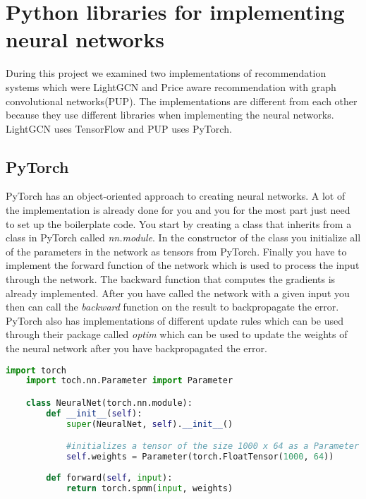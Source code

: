 \section{Python libraries for implementing neural networks}
During this project we examined two implementations of recommendation systems which were LightGCN and Price aware recommendation with graph convolutional networks(PUP). 
The implementations are different from each other because they use different libraries when implementing the neural networks.
LightGCN uses TensorFlow and PUP uses PyTorch.

\subsection{PyTorch}
PyTorch has an object-oriented approach to creating neural networks.
A lot of the implementation is already done for you and you for the most part just need to set up the boilerplate code.
You start by creating a class that inherits from a class in PyTorch called \textit{nn.module}.
In the constructor of the class you initialize all of the parameters in the network as tensors from PyTorch.
Finally you have to implement the forward function of the network which is used to process the input through the network.
The backward function that computes the gradients is already implemented.
After you have called the network with a given input you then can call the \textit{backward} function on the result to backpropagate the error.
PyTorch also has implementations of different update rules which can be used through their package called \textit{optim} which can be used to update the weights of the neural network after you have backpropagated the error.

\begin{lstlisting}[language=Python]
	import torch
	import toch.nn.Parameter import Parameter

	class NeuralNet(torch.nn.module):
		def __init__(self):
			super(NeuralNet, self).__init__()

			#initializes a tensor of the size 1000 x 64 as a Parameter in the neural network
			self.weights = Parameter(torch.FloatTensor(1000, 64))
		
		def forward(self, input):
			return torch.spmm(input, weights)

\end{lstlisting}

